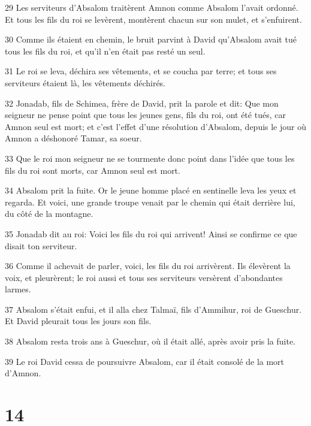 \par 29 Les serviteurs d'Absalom traitèrent Amnon comme Absalom l'avait ordonné. Et tous les fils du roi se levèrent, montèrent chacun sur son mulet, et s'enfuirent.
\par 30 Comme ils étaient en chemin, le bruit parvint à David qu'Absalom avait tué tous les fils du roi, et qu'il n'en était pas resté un seul.
\par 31 Le roi se leva, déchira ses vêtements, et se coucha par terre; et tous ses serviteurs étaient là, les vêtements déchirés.
\par 32 Jonadab, fils de Schimea, frère de David, prit la parole et dit: Que mon seigneur ne pense point que tous les jeunes gens, fils du roi, ont été tués, car Amnon seul est mort; et c'est l'effet d'une résolution d'Absalom, depuis le jour où Amnon a déshonoré Tamar, sa soeur.
\par 33 Que le roi mon seigneur ne se tourmente donc point dans l'idée que tous les fils du roi sont morts, car Amnon seul est mort.
\par 34 Absalom prit la fuite. Or le jeune homme placé en sentinelle leva les yeux et regarda. Et voici, une grande troupe venait par le chemin qui était derrière lui, du côté de la montagne.
\par 35 Jonadab dit au roi: Voici les fils du roi qui arrivent! Ainsi se confirme ce que disait ton serviteur.
\par 36 Comme il achevait de parler, voici, les fils du roi arrivèrent. Ils élevèrent la voix, et pleurèrent; le roi aussi et tous ses serviteurs versèrent d'abondantes larmes.
\par 37 Absalom s'était enfui, et il alla chez Talmaï, fils d'Ammihur, roi de Gueschur. Et David pleurait tous les jours son fils.
\par 38 Absalom resta trois ans à Gueschur, où il était allé, après avoir pris la fuite.
\par 39 Le roi David cessa de poursuivre Absalom, car il était consolé de la mort d'Amnon.

\chapter{14}

